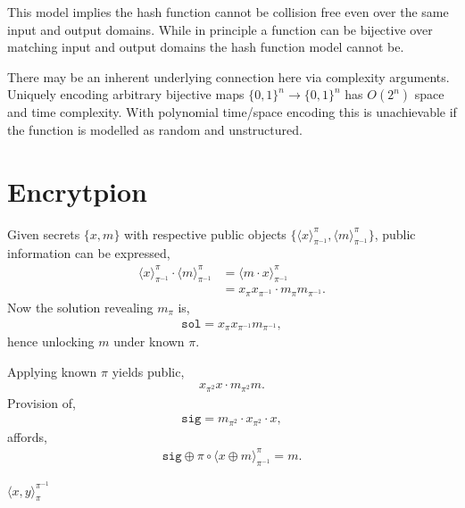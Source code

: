 \documentclass[twocolumn, aps, amsmath, amssymb, nofootinbib, superscriptaddress, longbibliography, doublefloatfix, table-of-contents, eqsecnum, rmp]{revtex4-2}
\def\braid#1#2#3#4{\langle#1,#2\rangle_{#3}^{#4}}
\def\selfbraid#1#2#3{\langle#1\rangle_{#2}^{#3}}
\begin{document}
This model implies the hash function cannot be collision free even over the same input and output domains. While in principle a function can be bijective over matching input and output domains the hash function model cannot be.

There may be an inherent underlying connection here via complexity arguments. Uniquely encoding arbitrary bijective maps \mbox{$\{0,1\}^n\to \{0,1\}^n$} has $O(2^n)$ space and time complexity. With polynomial time/space encoding this is unachievable if the function is modelled as random and unstructured.

\section{Encrytpion}

Given secrets $\{x,m\}$ with respective public objects $\{\selfbraid{x}{\pi^{-1}}{\pi},\selfbraid{m}{{\pi}^{-1}}{\pi}\}$, public information can be expressed,
\begin{align}
	\selfbraid{x}{\pi^{-1}}{\pi} \cdot \selfbraid{m}{{\pi}^{-1}}{\pi} &= \selfbraid{m\cdot x}{{\pi}^{-1}}{\pi} \nonumber\\
	&= x_{\pi}x_{\pi^{-1}} \cdot m_\pi m_{\pi^{-1}}.
\end{align}
Now the solution revealing $m_\pi$ is,
\begin{align}
	\mathtt{sol} = x_\pi x_{\pi^{-1}} m_{\pi^{-1}},
\end{align}
hence unlocking $m$ under known $\pi$.


Applying known $\pi$ yields public,
\begin{align}
	x_{\pi^2}x \cdot m_{\pi^2} m.
\end{align}
Provision of,
\begin{align}
	\mathtt{sig} = m_{\pi^2} \cdot x_{\pi^2} \cdot x,
\end{align}
affords,
\begin{align}
	\mathtt{sig} \oplus \pi \circ \selfbraid{x\oplus m}{\pi^{-1}}{\pi} = m.
\end{align}

$\braid{x}{y}{\pi}{\pi^{-1}}$

\end{document}
